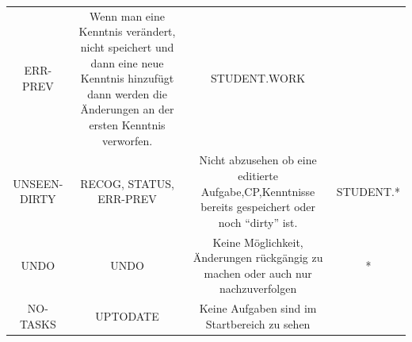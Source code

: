 \documentclass[
  12pt,
  ngerman,
  a4paper,
]{article}
\begin{document}
\begin{longtable}[]{@{}cccc@{}}
\begin{minipage}[t]{0.13\columnwidth}
ERR-PREV\strut
\end{minipage} & \begin{minipage}[t]{0.33\columnwidth}\centering
Wenn man eine Kenntnis verändert, nicht speichert und dann eine neue
Kenntnis hinzufügt dann werden die Änderungen an der ersten Kenntnis
verworfen.\strut
\end{minipage} & \begin{minipage}[t]{0.32\columnwidth}\centering
STUDENT.WORK\strut
\end{minipage}\tabularnewline
\begin{minipage}[t]{0.11\columnwidth}\centering
UNSEEN-DIRTY\strut
\end{minipage} & \begin{minipage}[t]{0.13\columnwidth}\centering
RECOG, STATUS, ERR-PREV\strut
\end{minipage} & \begin{minipage}[t]{0.33\columnwidth}\centering
Nicht abzusehen ob eine editierte Aufgabe,CP,Kenntnisse bereits
gespeichert oder noch ``dirty'' ist.\strut
\end{minipage} & \begin{minipage}[t]{0.32\columnwidth}\centering
STUDENT.*\strut
\end{minipage}\tabularnewline
\begin{minipage}[t]{0.11\columnwidth}\centering
UNDO\strut
\end{minipage} & \begin{minipage}[t]{0.13\columnwidth}\centering
UNDO\strut
\end{minipage} & \begin{minipage}[t]{0.33\columnwidth}\centering
Keine Möglichkeit, Änderungen rückgängig zu machen oder auch nur
nachzuverfolgen\strut
\end{minipage} & \begin{minipage}[t]{0.32\columnwidth}\centering
*\strut
\end{minipage}\tabularnewline
\begin{minipage}[t]{0.11\columnwidth}\centering
NO-TASKS\strut
\end{minipage} & \begin{minipage}[t]{0.13\columnwidth}\centering
UPTODATE\strut
\end{minipage} & \begin{minipage}[t]{0.33\columnwidth}\centering
Keine Aufgaben sind im Startbereich zu sehen\strut
\end{minipage} & \begin{minipage}[t]{0.32\columnwidth}\centering

\end{minipage}
\end{longtable}
\end{document}
